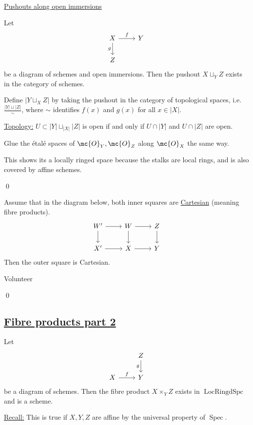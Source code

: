 \documentclass[x11names,reqno,14pt]{extarticle}
\renewcommand{\O}{\mc{O}}
\DeclareMathOperator{\Spec}{Spec}
\DeclareMathOperator{\LRS}{LocRingdSpc}
\begin{document}
\underline{Pushouts along open immersions}

\lem

Let 
\[
\begin{tikzcd}
X \ar[r,"f"] \ar[d,"g"'] & Y \\
Z & 
\end{tikzcd}
\]
be a diagram of schemes and open immersions. Then the pushout $X \sqcup_Y Z$ exists in the category of schemes. 

\proof

Define $|Y\sqcup_XZ|$ by taking the pushout in the category of topological spaces, i.e. $\frac{|Y|\sqcup|Z|}{\sim}$, where $\sim$ identifies $f(x)$ and $g(x)$ for all $x \in |X|$. 

\underline{Topology:} $U \subset |Y| \sqcup_{|X|}|Z|$ is open if and only if $U \cap |Y|$ and $U \cap |Z|$ are open. 

Glue the \'etal\'e spaces of $\O_Y,\O_Z$ along $\O_X$ the same way. 

This shows its a locally ringed space because the stalks are local rings, and is also covered by affine schemes. 

\qed

\lem

Assume that in the diagram below, both inner squares are \underline{Cartesian} (meaning fibre products).
\[
\begin{tikzcd}
W' \ar[d] \ar[r] \ar[dr,phantom]& W \ar[d] \ar[r] & Z \ar[d]\\
X'\ar[r] & X \ar[r] & Y 
\end{tikzcd}
\]
Then the outer square is Cartesian.

\proof

Volunteer

\qed

\subsection*{\underline{Fibre products part 2}}

\prop

Let 
\[
\begin{tikzcd}
& Z \ar[d, "g"'] \\
X \ar[r, "f"] & Y
\end{tikzcd}
\]
be a diagram of schemes. Then the fibre product $X\times_YZ$ exists in $\LRS$ and is a scheme.

\proof

\underline{Recall:} This is true if $X, Y, Z$ are affine by the universal property of $\Spec$. 
\end{document}

